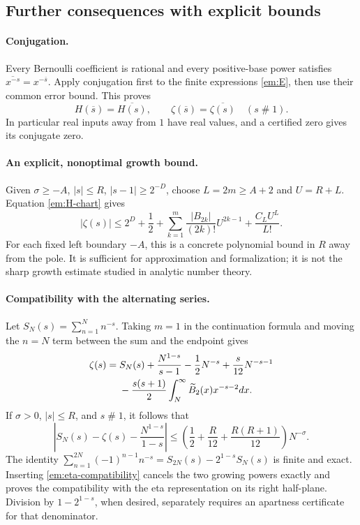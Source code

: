 \subsection{Further consequences with explicit bounds}

\paragraph{Conjugation.}
Every Bernoulli coefficient is rational and every positive-base power
satisfies $\overline{x^{-s}}=x^{-\overline s}$.  Apply conjugation first
to the finite expressions \eqref{em:E}, then use their common error
bound.  This proves
\begin{equation}
 H(\overline s)=\overline{H(s)},\qquad
 \zeta(\overline s)=\overline{\zeta(s)}\quad(s\mathrel{\#}1).
 \label{em:conjugation}
\end{equation}
In particular real inputs away from $1$ have real values, and a certified
zero gives its conjugate zero.

\paragraph{An explicit, nonoptimal growth bound.}
Given $\sigma\geq-A$, $|s|\leq R$, $|s-1|\geq2^{-D}$, choose
$L=2m\geq A+2$ and $U=R+L$.  Equation \eqref{em:H-chart} gives
\begin{equation}
 |\zeta(s)|\leq 2^D+\frac12+
  \sum_{k=1}^m\frac{|B_{2k}|}{(2k)!}U^{2k-1}
          +\frac{C_LU^L}{L!}.
 \label{em:growth}
\end{equation}
For each fixed left boundary $-A$, this is a concrete polynomial bound
in $R$ away from the pole.  It is sufficient for approximation and
formalization; it is not the sharp growth estimate studied in analytic
number theory.

\paragraph{Compatibility with the alternating series.}
Let $S_N(s)=\sum_{n=1}^Nn^{-s}$.  Taking $m=1$ in the continuation
formula and moving the $n=N$ term between the sum and the endpoint gives
\begin{align}
 \zeta(s)={}&S_N(s)+\frac{N^{1-s}}{s-1}-\frac12N^{-s}
       +\frac{s}{12}N^{-s-1}\notag\\
 &-\frac{s(s+1)}2\int_N^\infty\widetilde B_2(x)x^{-s-2}dx.
 \label{em:SN}
\end{align}
If $\sigma>0$, $|s|\leq R$, and $s\mathrel{\#}1$, it follows that
\begin{equation}
 \left|S_N(s)-\zeta(s)-\frac{N^{1-s}}{1-s}\right|
 \leq\left(\frac12+\frac R{12}+\frac{R(R+1)}{12}\right)N^{-\sigma}.
 \label{em:eta-compatibility}
\end{equation}
The identity
$\sum_{n=1}^{2N}(-1)^{n-1}n^{-s}
 =S_{2N}(s)-2^{1-s}S_N(s)$ is finite and exact.  Inserting
\eqref{em:eta-compatibility} cancels the two growing powers exactly and
proves the compatibility with the eta representation on its right
half-plane.  Division by $1-2^{1-s}$, when desired, separately requires
an apartness certificate for that denominator.
